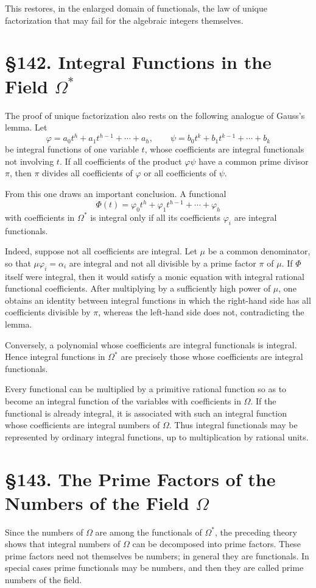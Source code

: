 \documentclass[12pt,a4paper]{article}
\newcommand{\webersection}[2]{\clearpage\section*{\S #1. #2}}
\begin{document}
This restores, in the enlarged domain of functionals, the law of unique factorization that may fail for the algebraic integers themselves.

\webersection{142}{Integral Functions in the Field \(\Omega^*\)}

The proof of unique factorization also rests on the following analogue of Gauss's lemma.  Let
\[
 \varphi=a_0t^h+a_1t^{h-1}+\cdots+a_h,
\qquad
 \psi=b_0t^k+b_1t^{k-1}+\cdots+b_k
\]
be integral functions of one variable \(t\), whose coefficients are integral functionals not involving \(t\).  If all coefficients of the product \(\varphi\psi\) have a common prime divisor \(\pi\), then \(\pi\) divides all coefficients of \(\varphi\) or all coefficients of \(\psi\).

From this one draws an important conclusion.  A functional
\begin{equation}
 \Phi(t)=\varphi_0t^h+\varphi_1t^{h-1}+\cdots+
\varphi_h \tag{1}
\end{equation}
with coefficients in \(\Omega^*\) is integral only if all its coefficients \(\varphi_i\) are integral functionals.

Indeed, suppose not all coefficients are integral.  Let \(\mu\) be a common denominator, so that \(\mu\varphi_i=\alpha_i\) are integral and not all divisible by a prime factor \(\pi\) of \(\mu\).  If \(\Phi\) itself were integral, then it would satisfy a monic equation with integral rational functional coefficients.  After multiplying by a sufficiently high power of \(\mu\), one obtains an identity between integral functions in which the right-hand side has all coefficients divisible by \(\pi\), whereas the left-hand side does not, contradicting the lemma.

Conversely, a polynomial whose coefficients are integral functionals is integral.  Hence integral functions in \(\Omega^*\) are precisely those whose coefficients are integral functionals.

Every functional can be multiplied by a primitive rational function so as to become an integral function of the variables with coefficients in \(\Omega\).  If the functional is already integral, it is associated with such an integral function whose coefficients are integral numbers of \(\Omega\).  Thus integral functionals may be represented by ordinary integral functions, up to multiplication by rational units.

\webersection{143}{The Prime Factors of the Numbers of the Field \(\Omega\)}

Since the numbers of \(\Omega\) are among the functionals of \(\Omega^*\), the preceding theory shows that integral numbers of \(\Omega\) can be decomposed into prime factors.  These prime factors need not themselves be numbers; in general they are functionals.  In special cases prime functionals may be numbers, and then they are called prime numbers of the field.
\end{document}
